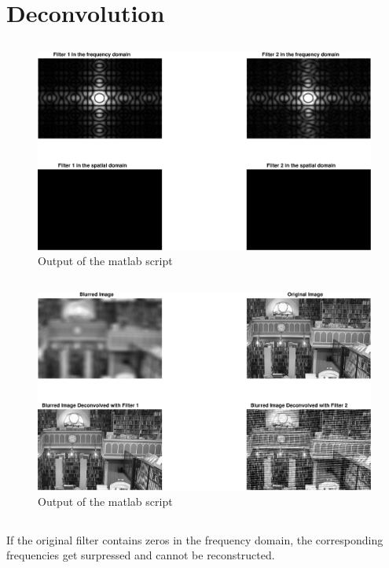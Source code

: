 \documentclass[DIN, pagenumber=false, fontsize=11pt, parskip=half]{scrartcl}
\begin{document}
    \section{Deconvolution}
    \subsection{}
    
    \begin{figure}[H]
        \centering
        \includegraphics[width=\textwidth]{sh03ex02_1.eps}
        \caption{Output of the matlab script}
    \end{figure}

    \subsection{}
    
    \begin{figure}[H]
        \centering
        \includegraphics[width=\textwidth]{sh03ex02_2.eps}
        \caption{Output of the matlab script}
    \end{figure}

    \subsection{}

    \subsection{}
    If the original filter contains zeros in the frequency domain, the corresponding frequencies get surpressed and cannot be reconstructed.
\end{document}
